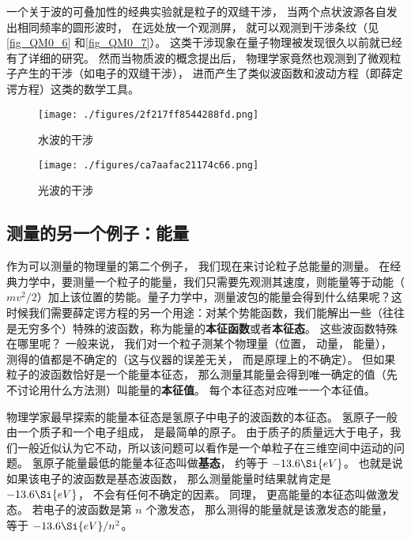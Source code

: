 一个关于波的可叠加性的经典实验就是粒子的双缝干涉， 当两个点状波源各自发出相同频率的圆形波时， 在远处放一个观测屏， 就可以观测到干涉条纹（见\autoref{fig_QM0_6} 和\autoref{fig_QM0_7}）。 这类干涉现象在量子物理被发现很久以前就已经有了详细的研究。 然而当物质波的概念提出后， 物理学家竟然也观测到了微观粒子产生的干涉（如电子的双缝干涉）， 进而产生了类似波函数和波动方程（即薛定谔方程）这类的数学工具。

\begin{figure}[ht]
\centering
\texttt{[image: ./figures/2f217ff8544288fd.png]}
\caption{水波的干涉} \label{fig_QM0_6}
\end{figure}

\begin{figure}[ht]
\centering
\texttt{[image: ./figures/ca7aafac21174c66.png]}
\caption{光波的干涉} \label{fig_QM0_7}
\end{figure}


\subsection{测量的另一个例子：能量}
作为可以测量的物理量的第二个例子， 我们现在来讨论粒子总能量的测量。 在经典力学中，要测量一个粒子的能量，我们只需要先观测其速度，则能量等于动能（$mv^2/2$）加上该位置的势能。量子力学中，测量波包的能量会得到什么结果呢？这时候我们需要薛定谔方程的另一个用途：对某个势能函数，我们能解出一些（往往是无穷多个）特殊的波函数，称为能量的\textbf{本征函数}或者\textbf{本征态}。 这些波函数特殊在哪里呢？ 一般来说， 我们对一个粒子测某个物理量（位置， 动量， 能量）， 测得的值都是不确定的（这与仪器的误差无关， 而是原理上的不确定）。 但如果粒子的波函数恰好是一个能量本征态， 那么测量其能量会得到唯一确定的值（先不讨论用什么方法测）叫能量的\textbf{本征值}。 每个本征态对应唯一一个本征值。

物理学家最早探索的能量本征态是氢原子中电子的波函数的本征态。 氢原子一般由一个质子和一个电子组成， 是最简单的原子。 由于质子的质量远大于电子，我们一般近似认为它不动，所以该问题可以看作是一个单粒子在三维空间中运动的问题。 氢原子能量最低的能量本征态叫做\textbf{基态}， 约等于 $-13.6\Si{eV}$。 也就是说如果该电子的波函数是基态波函数， 那么测量能量时结果就肯定是 $-13.6\Si{eV}$， 不会有任何不确定的因素。 同理， 更高能量的本征态叫做激发态。 若电子的波函数是第 $n$ 个激发态， 那么测得的能量就是该激发态的能量， 等于 $-13.6\Si{eV}/n^2$。

